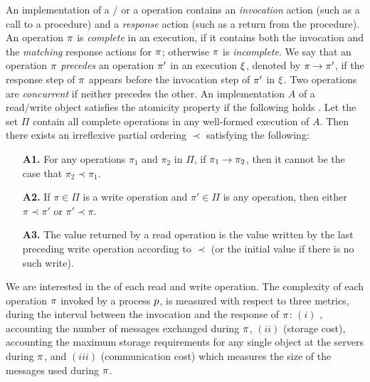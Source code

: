 An implementation of a / or a  operation contains an \textit{invocation} action 
	(such as a call to a procedure) and a \textit{response} action (such as a
	return from the procedure). An operation $\pi$ is \textit{complete} in an execution, if it
	contains both the invocation and the \textit{matching} response actions for $\pi$; otherwise $\pi$
	is \textit{incomplete}. 
	We say that an operation $\pi$ \textit{precedes} an operation $\pi'$ in an execution $\EX$,
	denoted by $\pi\rightarrow\pi'$, if the response step of $\pi$ appears before the invocation
	step of $\pi'$ in $\EX$. Two operations are \textit{concurrent} if neither precedes the other.
	An implementation $A$ of a read/write object satisfies the atomicity  property
	if the following holds \cite{Lynch1996}. Let the set $\Pi$ contain all complete  operations in
	any well-formed execution of $A$. 
	Then %
	there exists an irreflexive partial ordering $\prec$ satisfying the
	following:	
	\begin{itemize}
		\item [\bf A1.] 
		For any operations $\pi_1$ and $\pi_2$ in $\Pi$,  if $\pi_1\rightarrow\pi_2$, then it
		cannot be the case that $\pi_2\prec \pi_1$.
		\item[\bf A2.] 
		If $\pi\in\Pi$ is a write operation and $\pi'\in\Pi$ is any  operation,  
		then either $\pi\prec \pi'$ or $\pi'\prec \pi$.
		\item[\bf A3.] 
		The value returned by a read operation is the value 
		written by the last preceding write operation according to
		$\prec$ (or the initial value if there is no such write).
\end{itemize}


 We are interested in the  of each
read and write operation. The complexity of each operation $\pi$ invoked by a process 
$p$, is measured with respect to three metrics, during the interval between the invocation 
and the response of $\pi$: $(i)$ , accounting the number of messages 
exchanged during $\pi$, $(ii)$  (storage cost), accounting the maximum storage requirements for 
any single object at the servers during $\pi$, and  $(iii)$  (communication cost)
which measures the size of the messages used during $\pi$. 

